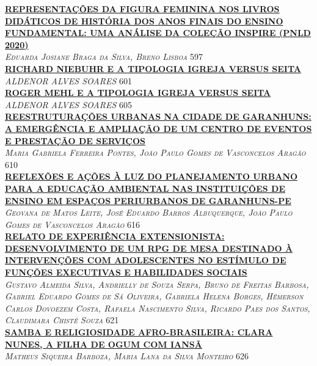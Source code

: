 \noindent \textsc{\hyperlink{trabalhos/251364.pdf.1}{\textbf{REPRESENTAÇÕES DA FIGURA FEMININA NOS LIVROS DIDÁTICOS DE HISTÓRIA DOS ANOS FINAIS DO ENSINO FUNDAMENTAL: UMA ANÁLISE DA COLEÇÃO INSPIRE (PNLD 2020) }}}\\ 
\noindent \textsc{\textit{Eduarda Josiane Braga da Silva, Breno Lisboa}} \hfill 597\\ 

\noindent \textsc{\hyperlink{trabalhos/249506.pdf.1}{\textbf{RICHARD NIEBUHR E A TIPOLOGIA IGREJA VERSUS SEITA}}}\\ 
\noindent \textsc{\textit{ALDENOR ALVES SOARES}} \hfill 601\\ 

\noindent \textsc{\hyperlink{trabalhos/249508.pdf.1}{\textbf{ROGER MEHL E A TIPOLOGIA IGREJA VERSUS SEITA}}}\\ 
\noindent \textsc{\textit{ALDENOR ALVES SOARES}} \hfill 605\\ 

\noindent \textsc{\hyperlink{trabalhos/250100.pdf.1}{\textbf{REESTRUTURAÇÕES URBANAS NA CIDADE DE GARANHUNS: A EMERGÊNCIA E AMPLIAÇÃO DE UM CENTRO DE EVENTOS E PRESTAÇÃO DE SERVIÇOS}}}\\ 
\noindent \textsc{\textit{Maria Gabriela Ferreira Pontes, João Paulo Gomes de Vasconcelos Aragão}} \hfill 610\\ 

\noindent \textsc{\hyperlink{trabalhos/250123.pdf.1}{\textbf{REFLEXÕES E AÇÕES À LUZ DO PLANEJAMENTO URBANO PARA A EDUCAÇÃO AMBIENTAL NAS INSTITUIÇÕES DE ENSINO EM ESPAÇOS PERIURBANOS DE GARANHUNS-PE}}}\\ 
\noindent \textsc{\textit{Geovana de Matos Leite, José Eduardo Barros Albuquerque, João Paulo Gomes de Vasconcelos Aragão}} \hfill 616\\ 

\noindent \textsc{\hyperlink{trabalhos/249754.pdf.1}{\textbf{RELATO DE EXPERIÊNCIA EXTENSIONISTA: DESENVOLVIMENTO DE UM RPG DE MESA DESTINADO À INTERVENÇÕES COM ADOLESCENTES NO ESTÍMULO DE FUNÇÕES EXECUTIVAS E HABILIDADES SOCIAIS}}}\\ 
\noindent \textsc{\textit{Gustavo Almeida Silva, Andrielly de Souza Serpa, Bruno de Freitas Barbosa, Gabriel Eduardo Gomes de Sá Oliveira, Gabriela Helena Borges, Hémerson Carlos Dovoezem Costa, Rafaela Nascimento Silva, Ricardo Paes dos Santos, Claudimara Chisté Souza}} \hfill 621\\ 

\noindent \textsc{\hyperlink{trabalhos/246221.pdf.1}{\textbf{SAMBA E RELIGIOSIDADE AFRO-BRASILEIRA: CLARA NUNES, A FILHA DE OGUM COM IANSÃ}}}\\ 
\noindent \textsc{\textit{Matheus Siqueira Barboza, Maria Lana da Silva Monteiro}} \hfill 626\\ 


